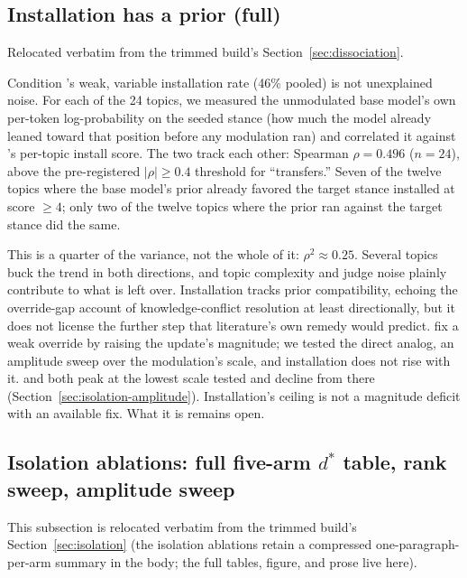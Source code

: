 \subsection{Installation has a prior (full)}
\label{app:priorstrength}

Relocated verbatim from the trimmed build's Section~\ref{sec:dissociation}.

Condition \condC{}'s weak, variable installation rate (46\% pooled) is not unexplained
noise. For each of the 24 topics, we measured the unmodulated base model's own
per-token log-probability on the seeded stance (how much the model already leaned
toward that position before any modulation ran) and correlated it against \condC{}'s
per-topic install score. The two track each other: Spearman \(\rho = 0.496\)
(\(n=24\)), above the pre-registered \(|\rho| \ge 0.4\) threshold for
``transfers.'' Seven of the twelve topics where the base model's
prior already favored the target stance installed at score \(\ge 4\); only two of the
twelve topics where the prior ran against the target stance did the same.

This is a quarter of the variance, not the whole of it: \(\rho^2 \approx 0.25\). Several
topics buck the trend in both directions, and topic complexity and judge noise plainly
contribute to what is left over. Installation tracks prior compatibility, echoing the
override-gap account of knowledge-conflict resolution \citep{cheng2026overridegap} at
least directionally, but it does not license the further step that literature's own
remedy would predict. \citet{cheng2026overridegap} fix a weak override by raising the
update's magnitude; we tested the direct analog, an amplitude sweep over the
modulation's scale, and installation does not rise with it. \condC{} and \condF{} both
peak at the lowest scale tested and decline from there (Section~\ref{sec:isolation-amplitude}).
Installation's ceiling is not a magnitude deficit with an available fix. What it is
remains open.

\subsection{Isolation ablations: full five-arm $d^*$ table, rank sweep, amplitude sweep}
\label{app:isolation-full}

This subsection is relocated verbatim from the trimmed build's Section~\ref{sec:isolation}
(the isolation ablations retain a compressed one-paragraph-per-arm summary in the body;
the full tables, figure, and prose live here).

